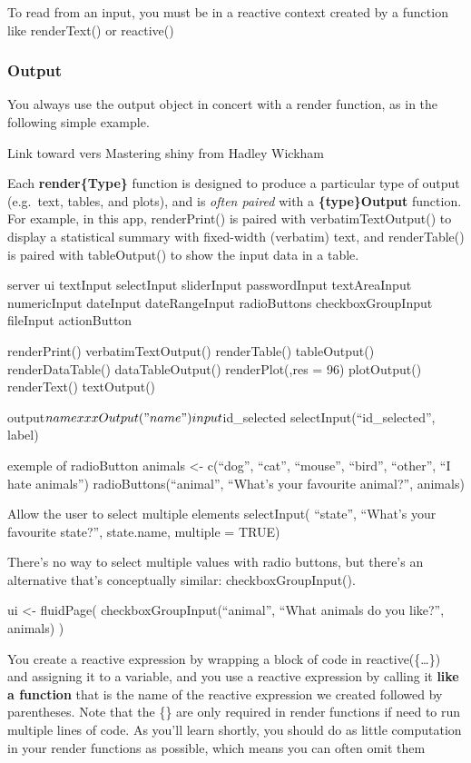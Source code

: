 \documentclass[
]{book}
\begin{document}
To read from an input, you must be in a reactive context created by a function like renderText() or reactive()

\hypertarget{output}{%
\subsubsection{Output}\label{output}}

You always use the output object in concert with a render function, as in the following simple example.

Link toward vers Mastering shiny from Hadley Wickham

Each \textbf{render\{Type\} }function is designed to produce a particular type of output (e.g.~text, tables, and plots), and is \emph{often paired} with a \textbf{\{type\}Output} function. For example, in this app, renderPrint() is paired with verbatimTextOutput() to display a statistical summary with fixed-width (verbatim) text, and renderTable() is paired with tableOutput() to show the input data in a table.

server ui
textInput
selectInput
sliderInput
passwordInput
textAreaInput
numericInput
dateInput
dateRangeInput
radioButtons
checkboxGroupInput
fileInput
actionButton

renderPrint() verbatimTextOutput()
renderTable() tableOutput()
renderDataTable() dataTableOutput()
renderPlot(,res = 96) plotOutput()\\
renderText() textOutput()

output\(name xxxOutput("name") input\)id\_selected selectInput(``id\_selected'', label)

exemple of radioButton
animals \textless- c(``dog'', ``cat'', ``mouse'', ``bird'', ``other'', ``I hate animals'')
radioButtons(``animal'', ``What's your favourite animal?'', animals)

Allow the user to select multiple elements
selectInput(
``state'', ``What's your favourite state?'', state.name,
multiple = TRUE)

There's no way to select multiple values with radio buttons, but there's an alternative that's conceptually similar: checkboxGroupInput().

ui \textless- fluidPage(
checkboxGroupInput(``animal'', ``What animals do you like?'', animals)
)

You create a reactive expression by wrapping a block of code in reactive(\{\ldots\}) and assigning it to a variable, and you use a reactive expression by calling it \textbf{like a function} that is the name of the reactive expression we created followed by parentheses.
Note that the \{\} are only required in render functions if need to run multiple lines of code. As you'll learn shortly, you should do as little computation in your render functions as possible, which means you can often omit them
\end{document}
